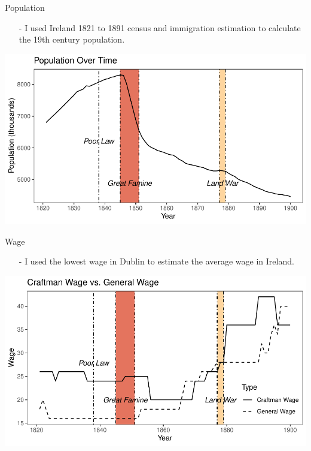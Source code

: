 \documentclass{beamer}[12pt]
\begin{document}
\begin{frame}{Population}
	\begin{itemize}
		\item[-] I used Ireland 1821 to 1891 census and immigration estimation to calculate the 19th century population.
	\end{itemize}
	\begin{center}
		\includegraphics[width=1\textwidth]{population.pdf}
	\end{center}

\end{frame}

\begin{frame}{Wage}
	\begin{itemize}
		\item[-] I used the lowest wage in Dublin to estimate the average wage in Ireland.
	\end{itemize}
	\begin{center}
	\includegraphics[width=1\textwidth]{wage.pdf}
	\end{center}
\end{frame}
\end{document}
